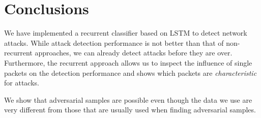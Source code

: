 \documentclass[sigconf,nonacm]{acmart}
\begin{document}
\section{Conclusions}

We have implemented a recurrent classifier based on LSTM to detect network attacks. While attack detection performance is not better than that of non-recurrent approaches, we can already detect attacks before they are over. Furthermore, the recurrent approach allows us to inspect the influence of single packets on the detection performance and shows which packets are \textit{characteristic} for attacks. 

We show that adversarial samples are possible even though the data we use are very different from those that are usually used when finding adversarial samples. 



\end{document}
